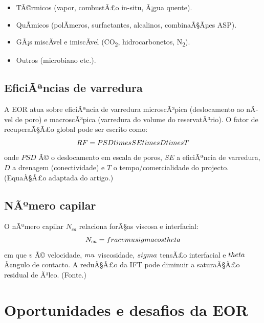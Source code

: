\documentclass[11pt,a4paper]{article}
\begin{document}
\begin{itemize}[noitemsep]
  \item TÃ©rmicos (vapor, combustÃ£o in-situ, Ã¡gua quente).
  \item QuÃ­micos (polÃ­meros, surfactantes, alcalinos, combinaÃ§Ãµes ASP).
  \item GÃ¡s miscÃ­vel e imiscÃ­vel (CO\textsubscript{2}, hidrocarbonetos, N\textsubscript{2}).
  \item Outros (microbiano etc.).
\end{itemize}

\subsection{EficiÃªncias de varredura}
A EOR atua sobre eficiÃªncia de varredura microscÃ³pica (deslocamento ao nÃ­vel de poro) e macroscÃ³pica (varredura do volume do reservatÃ³rio). O fator de recuperaÃ§Ã£o global pode ser escrito como:
\begin{equation}
RF = PSD \\times SE \\times D \\times T
\end{equation}
onde $PSD$ Ã© o deslocamento em escala de poros, $SE$ a eficiÃªncia de varredura, $D$ a drenagem (conectividade) e $T$ o tempo/comercialidade do projecto. (EquaÃ§Ã£o adaptada do artigo.)

\subsection{NÃºmero capilar}
O nÃºmero capilar $N_{ca}$ relaciona forÃ§as viscosa e interfacial:
\begin{equation}
N_{ca} = \\frac{v \\mu}{\\sigma \\cos\\theta}
\end{equation}
em que $v$ Ã© velocidade, $\\mu$ viscosidade, $\\sigma$ tensÃ£o interfacial e $\\theta$ Ã¢ngulo de contacto. A reduÃ§Ã£o da IFT pode diminuir a saturaÃ§Ã£o residual de Ã³leo. (Fonte.)

\section{Oportunidades e desafios da EOR}
\end{document}
